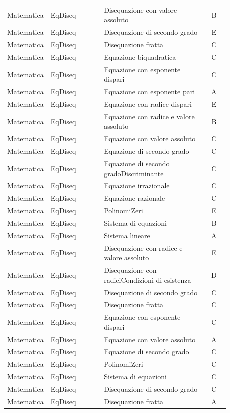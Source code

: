 \documentclass[20pt, a4paper]{article}
\begin{document}
\begin{longtable}{@{}>{\raggedright\arraybackslash}p{0.18\linewidth}>{\raggedright\arraybackslash}p{0.24\linewidth}>{\raggedright\arraybackslash}p{0.46\linewidth}c@{}}
Matematica & EqDiseq & Disequazione con valore assoluto & B \\
Matematica & EqDiseq & Disequazione di secondo grado & E \\
Matematica & EqDiseq & Disequazione fratta & C \\
Matematica & EqDiseq & Equazione biquadratica & C \\
Matematica & EqDiseq & Equazione con esponente dispari & C \\
Matematica & EqDiseq & Equazione con esponente pari & A \\
Matematica & EqDiseq & Equazione con radice dispari & E \\
Matematica & EqDiseq & Equazione con radice e valore assoluto & B \\
Matematica & EqDiseq & Equazione con valore assoluto & C \\
Matematica & EqDiseq & Equazione di secondo grado & C \\
Matematica & EqDiseq & Equazione di secondo gradoDiscriminante & C \\
Matematica & EqDiseq & Equazione irrazionale & C \\
Matematica & EqDiseq & Equazione razionale & C \\
Matematica & EqDiseq & PolinomiZeri & E \\
Matematica & EqDiseq & Sistema di equazioni & B \\
Matematica & EqDiseq & Sistema lineare & A \\
Matematica & EqDiseq & Disequazione con radice e valore assoluto & E \\
Matematica & EqDiseq & Disequazione con radiciCondizioni di esistenza & D \\
Matematica & EqDiseq & Disequazione di secondo grado & C \\
Matematica & EqDiseq & Disequazione fratta & C \\
Matematica & EqDiseq & Equazione con esponente dispari & C \\
Matematica & EqDiseq & Equazione con valore assoluto & A \\
Matematica & EqDiseq & Equazione di secondo grado & C \\
Matematica & EqDiseq & PolinomiZeri & C \\
Matematica & EqDiseq & Sistema di equazioni & C \\
Matematica & EqDiseq & Disequazione di secondo grado & C \\
Matematica & EqDiseq & Disequazione fratta & A \\

\end{longtable}
\end{document}

